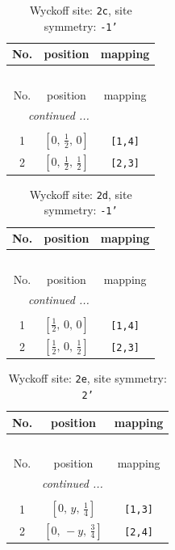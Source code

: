 \documentclass[fleqn,8pt]{jsarticle}
\begin{document}
\begin{longtable}{ccc}
\caption{Wyckoff site: {\tt 2c}, site symmetry: {\tt -1'}}
 \\
 \hline \hline
No. & position & mapping \\ \hline \endfirsthead

\multicolumn{2}{l}{\tablename\ \thetable{}} \\
 \hline \hline
No. & position & mapping \\ \hline \endhead

 \hline \hline
\multicolumn{2}{r}{\footnotesize\it continued ...} \\ \endfoot

 \hline \hline
\multicolumn{2}{r}{} \\ \endlastfoot

1 & $\left[ 0,\, \frac{1}{2},\, 0 \right]$ & {\tt [1,4]} \\ \hline
2 & $\left[ 0,\, \frac{1}{2},\, \frac{1}{2} \right]$ & {\tt [2,3]} \\
\end{longtable}
\renewcommand{\arraystretch}{1.2}
\begin{longtable}{ccc}
\caption{Wyckoff site: {\tt 2d}, site symmetry: {\tt -1'}}
 \\
 \hline \hline
No. & position & mapping \\ \hline \endfirsthead

\multicolumn{2}{l}{\tablename\ \thetable{}} \\
 \hline \hline
No. & position & mapping \\ \hline \endhead

 \hline \hline
\multicolumn{2}{r}{\footnotesize\it continued ...} \\ \endfoot

 \hline \hline
\multicolumn{2}{r}{} \\ \endlastfoot

1 & $\left[ \frac{1}{2},\, 0,\, 0 \right]$ & {\tt [1,4]} \\ \hline
2 & $\left[ \frac{1}{2},\, 0,\, \frac{1}{2} \right]$ & {\tt [2,3]} \\
\end{longtable}
\renewcommand{\arraystretch}{1.2}
\begin{longtable}{ccc}
\caption{Wyckoff site: {\tt 2e}, site symmetry: {\tt 2'}}
 \\
 \hline \hline
No. & position & mapping \\ \hline \endfirsthead

\multicolumn{2}{l}{\tablename\ \thetable{}} \\
 \hline \hline
No. & position & mapping \\ \hline \endhead

 \hline \hline
\multicolumn{2}{r}{\footnotesize\it continued ...} \\ \endfoot

 \hline \hline
\multicolumn{2}{r}{} \\ \endlastfoot

1 & $\left[ 0,\, y,\, \frac{1}{4} \right]$ & {\tt [1,3]} \\ \hline
2 & $\left[ 0,\, - y,\, \frac{3}{4} \right]$ & {\tt [2,4]} \\
\end{longtable}
\end{document}
